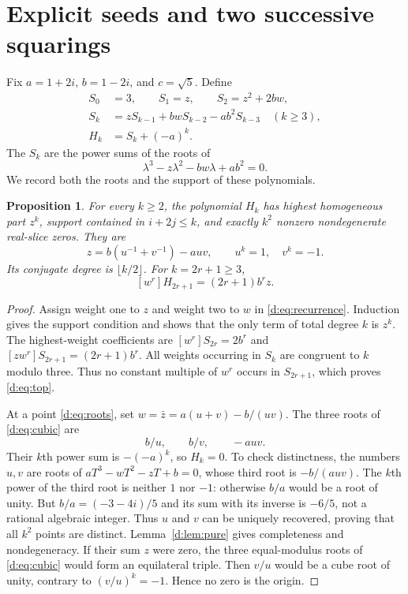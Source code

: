 \documentclass[UTF8,11pt]{ctexart}
\newtheorem{prop}[thm]{Proposition}
\theoremstyle{definition}
\numberwithin{equation}{section}
\begin{document}
\section{Explicit seeds and two successive squarings}\label{d:sec:seeds}

Fix $a=1+2i$, $b=1-2i$, and $c=\sqrt5$. Define
\begin{equation}\label{d:eq:recurrence}
 \begin{split}
 S_0&=3,\qquad S_1=z,\qquad S_2=z^2+2bw,\\
 S_k&=zS_{k-1}+bwS_{k-2}-ab^2S_{k-3}\quad(k\ge3),\\
 H_k&=S_k+(-a)^k.
 \end{split}
\end{equation}
The $S_k$ are the power sums of the roots of
\begin{equation}\label{d:eq:cubic}
 \lambda^3-z\lambda^2-bw\lambda+ab^2=0.
\end{equation}
We record both the roots and the support of these polynomials.
\begin{prop}\label{d:prop:seeds}
For every $k\ge2$, the polynomial $H_k$ has highest homogeneous part
$z^k$, support contained in $i+2j\le k$, and exactly $k^2$ nonzero
nondegenerate real-slice zeros. They are
\begin{equation}\label{d:eq:roots}
 z=b(u^{-1}+v^{-1})-auv,\qquad u^k=1,\quad v^k=-1.
\end{equation}
Its conjugate degree is $\lfloor k/2\rfloor$. For $k=2r+1\ge3$,
\begin{equation}\label{d:eq:top}
 [w^r]H_{2r+1}=(2r+1)b^rz.
\end{equation}
\end{prop}
\begin{proof}
Assign weight one to $z$ and weight two to $w$ in
\eqref{d:eq:recurrence}. Induction gives the support condition and shows
that the only term of total degree $k$ is $z^k$. The highest-weight
coefficients are $[w^r]S_{2r}=2b^r$ and
$[zw^r]S_{2r+1}=(2r+1)b^r$. All weights occurring in $S_k$ are congruent
to $k$ modulo three. Thus no constant multiple of $w^r$ occurs in
$S_{2r+1}$, which proves \eqref{d:eq:top}.

At a point \eqref{d:eq:roots}, set $w=\bar z=a(u+v)-b/(uv)$.
The three roots of \eqref{d:eq:cubic} are
\[
 b/u,\qquad b/v,\qquad -auv.
\]
Their $k$th power sum is $-(-a)^k$, so $H_k=0$.
To check distinctness, the numbers $u,v$ are roots of
$aT^3-wT^2-zT+b=0$, whose third root is $-b/(auv)$.
The $k$th power of the third root is neither $1$ nor $-1$: otherwise
$b/a$ would be a root of unity. But $b/a=(-3-4i)/5$ and its sum with
its inverse is $-6/5$, not a rational algebraic integer. Thus $u$ and $v$
can be uniquely recovered, proving that all $k^2$ points are distinct.
Lemma~\ref{d:lem:pure} gives completeness and nondegeneracy.
If their sum $z$ were zero, the three equal-modulus roots of
\eqref{d:eq:cubic} would form an equilateral triple. Then $v/u$ would be
a cube root of unity, contrary to $(v/u)^k=-1$. Hence no zero is the origin.
\end{proof}
\end{document}
